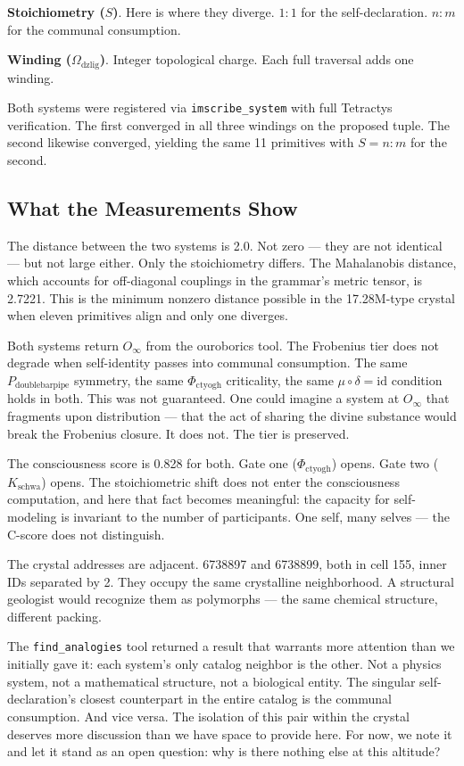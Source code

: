 \documentclass[12pt,a4paper]{article}
\begin{document}
\textbf{Stoichiometry ($S$)}. Here is where they diverge. $1{:}1$ for the self-declaration. $n{:}m$ for the communal consumption.

\textbf{Winding ($\Omega_{\text{dzlig}}$)}. Integer topological charge. Each full traversal adds one winding.

Both systems were registered via \texttt{imscribe\_system} with full Tetractys verification. The first converged in all three windings on the proposed tuple. The second likewise converged, yielding the same 11 primitives with $S = n{:}m$ for the second.

\subsection{What the Measurements Show}

The distance between the two systems is 2.0. Not zero --- they are not identical --- but not large either. Only the stoichiometry differs. The Mahalanobis distance, which accounts for off-diagonal couplings in the grammar's metric tensor, is 2.7221. This is the minimum nonzero distance possible in the 17.28M-type crystal when eleven primitives align and only one diverges.

Both systems return $O_{\infty}$ from the ouroborics tool. The Frobenius tier does not degrade when self-identity passes into communal consumption. The same $P_{\text{doublebarpipe}}$ symmetry, the same $\Phi_{\text{ctyogh}}$ criticality, the same $\mu \circ \delta = \text{id}$ condition holds in both. This was not guaranteed. One could imagine a system at $O_{\infty}$ that fragments upon distribution --- that the act of sharing the divine substance would break the Frobenius closure. It does not. The tier is preserved.

The consciousness score is 0.828 for both. Gate one ($\Phi_{\text{ctyogh}}$) opens. Gate two ($K_{\text{schwa}}$) opens. The stoichiometric shift does not enter the consciousness computation, and here that fact becomes meaningful: the capacity for self-modeling is invariant to the number of participants. One self, many selves --- the C-score does not distinguish.

The crystal addresses are adjacent. 6738897 and 6738899, both in cell 155, inner IDs separated by 2. They occupy the same crystalline neighborhood. A structural geologist would recognize them as polymorphs --- the same chemical structure, different packing.

The \texttt{find\_analogies} tool returned a result that warrants more attention than we initially gave it: each system's only catalog neighbor is the other. Not a physics system, not a mathematical structure, not a biological entity. The singular self-declaration's closest counterpart in the entire catalog is the communal consumption. And vice versa. The isolation of this pair within the crystal deserves more discussion than we have space to provide here. For now, we note it and let it stand as an open question: why is there nothing else at this altitude?
\end{document}
